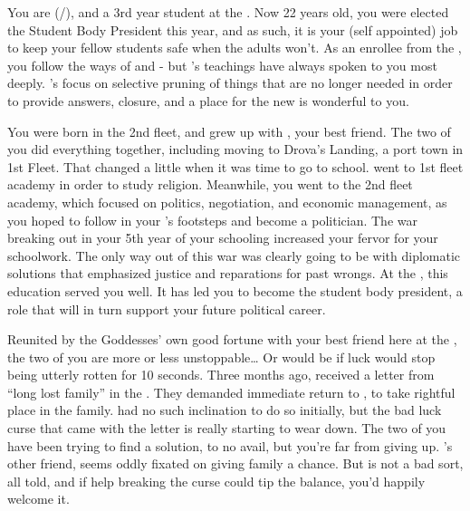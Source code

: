 \documentclass[char]{GL2020}
\begin{document}
\name{\cPresident{}}

You are \cPresident{\full} (\cPresident{\they}/\cPresident{\them}), and a 3rd year student at the \pSchool{}. Now 22 years old, you were elected the Student Body President this year, and as such, it is your (self appointed) job to keep your fellow students safe when the adults won't. As an enrollee from the \pShip{}, you follow the ways of \cEbb{\full} and \cFlow{\full} - but \cEbb{}'s teachings have always spoken to you most deeply. \cEbb{}'s focus on selective pruning of things that are no longer needed in order to provide answers, closure, and a place for the new is wonderful to you.

You were born in the 2nd fleet, and grew up with \cInitiate{\full}, your best friend. The two of you did everything together, including moving to Drova's Landing, a port town in 1st Fleet. That changed a little when it was time to go to school. \cInitiate{\They} went to 1st fleet academy in order to study religion. Meanwhile, you went to the 2nd fleet academy, which focused on politics, negotiation, and economic management, as you hoped to follow in your \cHeadDiplomat{\auncle}'s footsteps and become a politician. The war breaking out in your 5th year of your schooling increased your fervor for your schoolwork. The only way out of this war was clearly going to be with diplomatic solutions that emphasized justice and reparations for past wrongs. At the \pSchool{}, this education served you well. It has led you to become the student body president, a role that will in turn support your future political career. 

Reunited by the Goddesses' own good fortune with your best friend here at the \pSchool{}, the two of you are more or less unstoppable\ldots{} Or would be if \cInitiate{\their} luck would stop being utterly rotten for 10 seconds. Three months ago, \cInitiate{} received a letter from ``long lost family'' in the \pFarm{}. They demanded \cInitiate{\their} immediate return to \pFarm{}, to take \cInitiate{\their} rightful place in the family. \cInitiate{} had no such inclination to do so initially, but the bad luck curse that came with the letter is really starting to wear \cInitiate{\them} down. The two of you have been trying to find a solution, to no avail, but you're far from giving up. \cInitiate{}'s other friend, \cWarlordDaughter{\full} seems oddly fixated on \cInitiate{} giving \cInitiate{\their} \pFarm{} family a chance. But \cWarlordDaughter{} is not a bad sort, all told, and if \cWarlordDaughter{\their} help breaking the curse could tip the balance, you'd happily welcome it.
\end{document}
